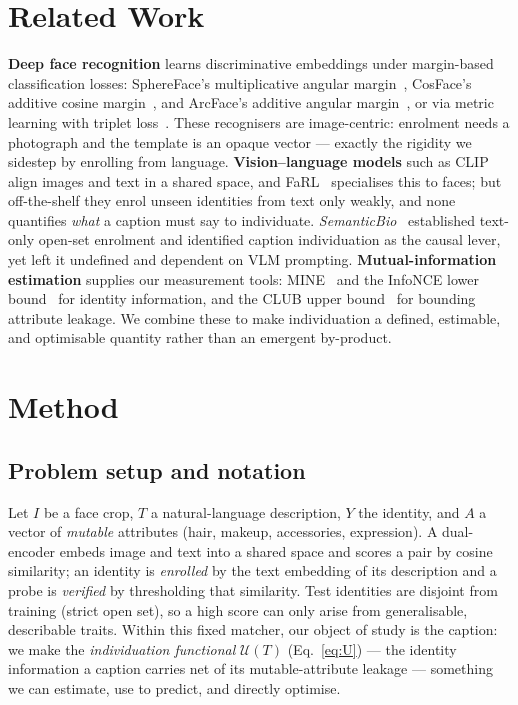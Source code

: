 \documentclass[10pt,twocolumn,letterpaper]{article}
\newcommand{\U}{\mathcal{U}}
\begin{document}
\section{Related Work}
\label{sec:related}
\textbf{Deep face recognition} learns discriminative embeddings under margin-based
classification losses: SphereFace's multiplicative angular margin~\cite{sphereface}, CosFace's
additive cosine margin~\cite{cosface}, and ArcFace's additive angular margin~\cite{arcface},
or via metric learning with triplet loss~\cite{facenet}. These recognisers are image-centric:
enrolment needs a photograph and the template is an opaque vector --- exactly the rigidity we
sidestep by enrolling from language. \textbf{Vision--language models} such as CLIP~\cite{clip}
align images and text in a shared space, and FaRL~\cite{farl} specialises this to faces; but
off-the-shelf they enrol unseen identities from text only weakly, and none quantifies
\emph{what} a caption must say to individuate. \emph{SemanticBio}~\cite{semanticbio}
established text-only open-set enrolment and identified caption individuation as the causal
lever, yet left it undefined and dependent on VLM prompting. \textbf{Mutual-information
estimation} supplies our measurement tools: MINE~\cite{mine} and the InfoNCE lower
bound~\cite{infonce} for identity information, and the CLUB upper bound~\cite{club} for
bounding attribute leakage. We combine these to make individuation a defined, estimable, and
optimisable quantity rather than an emergent by-product.

\section{Method}
\label{sec:method}

\subsection{Problem setup and notation}
\label{sec:setup}
Let $I$ be a face crop, $T$ a natural-language description, $Y$ the identity, and $A$ a vector
of \emph{mutable} attributes (hair, makeup, accessories, expression). A dual-encoder embeds
image and text into a shared space and scores a pair by cosine similarity; an identity is
\emph{enrolled} by the text embedding of its description and a probe is \emph{verified} by
thresholding that similarity. Test identities are disjoint from training (strict open set), so
a high score can only arise from generalisable, describable traits. Within this fixed matcher,
our object of study is the caption: we make the \emph{individuation functional} $\U(T)$
(Eq.~\ref{eq:U}) --- the identity information a caption carries net of its mutable-attribute
leakage --- something we can estimate, use to predict, and directly optimise.
\end{document}
